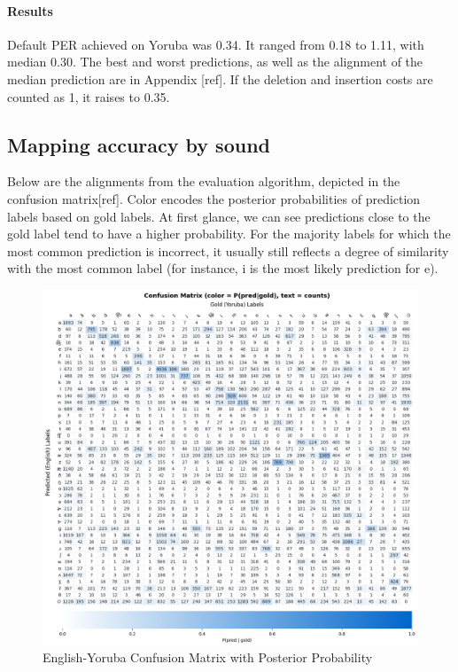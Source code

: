 \documentclass[11pt]{article}
\begin{document}
{\paragraph{Results} Default PER achieved on Yoruba was 0.34. It ranged from 0.18 to 1.11, with median 0.30. The best and worst predictions, as well as the alignment of the median prediction are in Appendix [ref]. If the deletion and insertion costs are counted as 1, it raises to 0.35.

\subsection{Mapping accuracy by sound}

Below are the alignments from the evaluation algorithm, depicted in the confusion matrix[ref]. Color encodes the posterior probabilities of prediction labels based on gold labels. At first glance, we can see predictions close to the gold label tend to have a higher probability. For the majority labels for which the most common prediction is incorrect, it usually still reflects a degree of similarity with the most common label (for instance, i is the most likely prediction for e).

\begin{figure}
    \centering
    \includegraphics[width=1\linewidth]{EngYorConfusionMatrix.png}
    \caption{English-Yoruba Confusion Matrix with Posterior Probability}
    \label{fig:placeholder}
\end{figure}

}
\end{document}
